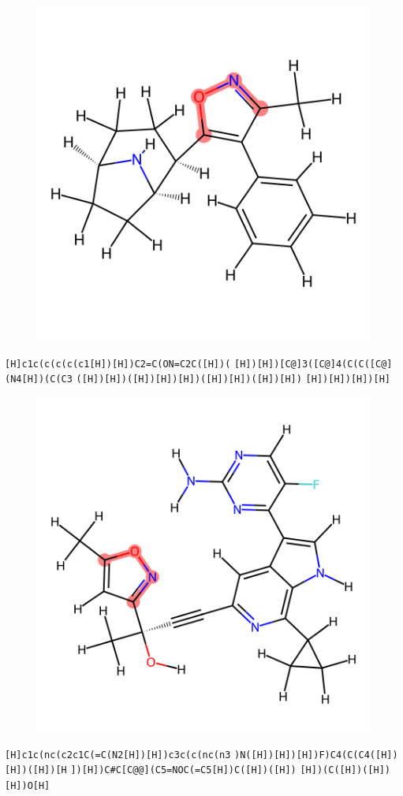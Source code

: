 \documentclass{article}
\begin{document}
\begin{figure}[ht]
\centering
    \includegraphics{mol168.png}
\end{figure}
\verb|[H]c1c(c(c(c(c1[H])[H])C2=C(ON=C2C([H])(| \verb|[H])[H])[C@]3([C@]4(C(C([C@](N4[H])(C(C3| \verb|([H])[H])([H])[H])[H])([H])[H])([H])[H])| \verb|[H])[H])[H])[H]|

\begin{figure}[ht]
\centering
    \includegraphics{mol169.png}
\end{figure}
\verb|[H]c1c(nc(c2c1C(=C(N2[H])[H])c3c(c(nc(n3| \verb|)N([H])[H])[H])F)C4(C(C4([H])[H])([H])[H| \verb|])[H])C#C[C@@](C5=NOC(=C5[H])C([H])([H])| \verb|[H])(C([H])([H])[H])O[H]|
\end{document}
